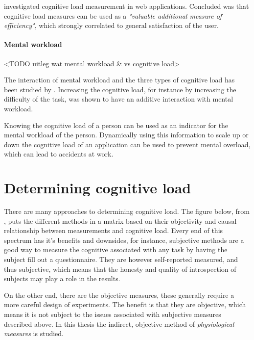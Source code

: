 \documentclass[11pt,leqno,a4paper]{report} %
\begin{document}
\citet{Schmutz2009} investigated cognitive load measurement in web applications. Concluded was that cognitive load measures can be used as a \textit{"valuable additional measure of efficiency"}, which strongly correlated to general satisfaction of the user. 

\paragraph{Mental workload}

<TODO uitleg wat mental workload & vs cognitive load>

The interaction of mental workload and the three types of cognitive load has been studied by \citet{Galy2012269}. Increasing the cognitive load, for instance by increasing the difficulty of the task, was shown to have an additive interaction with mental workload.

Knowing the cognitive load of a person can be used as an indicator for the mental workload of the person. Dynamically using this information to scale up or down the cognitive load of an application can be used to prevent mental overload, which can lead to accidents at work.
 

\section{Determining cognitive load}

There are many approaches to determining cognitive load. The figure below, from \citet{brunken2003direct}, puts the different methods in a matrix based on their objectivity and causal relationship between measurements and cognitive load. Every end of this spectrum has it's benefits and downsides, for instance, subjective methods are a good way to measure the cognitive associated with any task by having the subject fill out a questionnaire. They are however self-reported measured, and thus subjective, which means that the honesty and quality of introspection of subjects may play a role in the results.

On the other end, there are the objective measures, these generally require a more careful design of experiments. The benefit is that they are objective, which means it is not subject to the issues associated with subjective measures described above. In this thesis the indirect, objective method of \emph{physiological measures} is studied. 
\end{document}
